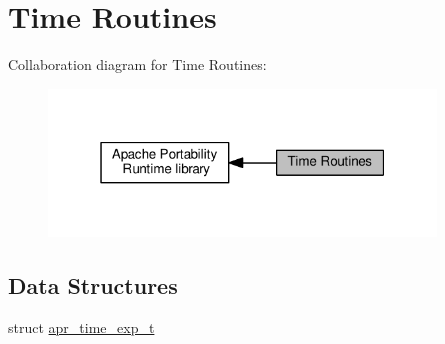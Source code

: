 \hypertarget{group__apr__time}{}\section{Time Routines}
\label{group__apr__time}
Collaboration diagram for Time Routines\+:
\nopagebreak
\begin{figure}[H]
\begin{center}
\leavevmode
\includegraphics[width=292pt]{group__apr__time}
\end{center}
\end{figure}
\subsection*{Data Structures}
\begin{DoxyCompactItemize}
\item 
struct \hyperlink{structapr__time__exp__t}{apr\+\_\+time\+\_\+exp\+\_\+t}
\end{DoxyCompactItemize}
